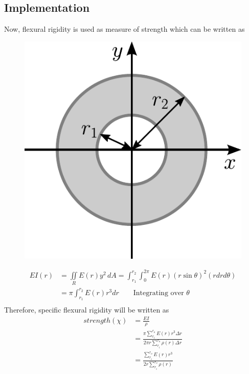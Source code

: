 \documentclass[10pt]{article}
\begin{document}
\subsection{Implementation}
Now, flexural rigidity is used as measure of strength which can be written as 
\begin{figure}
\includegraphics[scale=0.3]{moment_annulus}
\end{figure}
\begin{equation}\label{objective_eb}
\begin{split}
EI(r) &= \underset{R}{\iint}E(r)y^2\,dA = \int_{r_1}^{r_2}\int_0^{2\pi} E(r)(r\sin\theta)^2(rdrd\theta)\\
&= \pi\int_{r_1}^{r_2} E(r)r^3 dr \qquad \text{Integrating over $\theta$}\\
\end{split}
\end{equation}
Therefore, specific flexural rigidity will be written as
\begin{equation}\label{objective_eb}
\begin{split}
strength(\chi) &=\frac{EI}{\rho}\\
&=\frac{\pi\sum^{r_o}_{r_i}E(r)r^3\Delta r}{2\pi r\sum^{r_o}_{r_i}\rho(r)\Delta r}\\
&=\frac{\sum^{r_o}_{r_i}E(r)r^3}{2 r\sum^{r_o}_{r_i}\rho(r)}
\end{split}
\end{equation}
\end{document}
